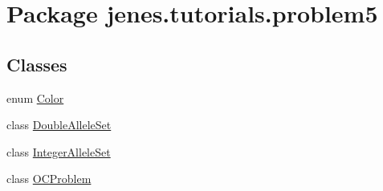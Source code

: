 \hypertarget{namespacejenes_1_1tutorials_1_1problem5}{\section{Package jenes.\-tutorials.\-problem5}
\label{namespacejenes_1_1tutorials_1_1problem5}
}
\subsection*{Classes}
\begin{DoxyCompactItemize}
\item 
enum \hyperlink{enumjenes_1_1tutorials_1_1problem5_1_1_color}{Color}
\item 
class \hyperlink{classjenes_1_1tutorials_1_1problem5_1_1_double_allele_set}{Double\-Allele\-Set}
\item 
class \hyperlink{classjenes_1_1tutorials_1_1problem5_1_1_integer_allele_set}{Integer\-Allele\-Set}
\item 
class \hyperlink{classjenes_1_1tutorials_1_1problem5_1_1_o_c_problem}{O\-C\-Problem}
\end{DoxyCompactItemize}
